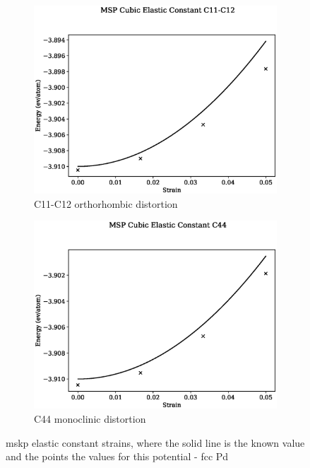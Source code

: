 \begin{figure}[htb]
\begin{subfigure}{.42\textwidth}
  \centering
  \includegraphics[width=.90\linewidth]{chapters/potentials_fe_pd_ru/fepd_potential/ec_mskp/msp_c11_c12_plot_bp_2.eps}  
  \caption{C11-C12 orthorhombic distortion}
  \label{fig:fepd-pdfcc-c11c12}
\end{subfigure}
\begin{subfigure}{.42\textwidth}
  \centering
  \includegraphics[width=.90\linewidth]{chapters/potentials_fe_pd_ru/fepd_potential/ec_mskp/msp_c44_plot_bp_2.eps}  
  \caption{C44 monoclinic distortion}
  \label{fig:fepd-pdfcc-c44}
\end{subfigure}
\label{fig:fepd-fefcc-c11c12c44}
\caption{\acrshort{mskp} elastic constant strains, where the solid line is the known value and the points the values for this potential - \acrshort{fcc} Pd}
\end{figure}



